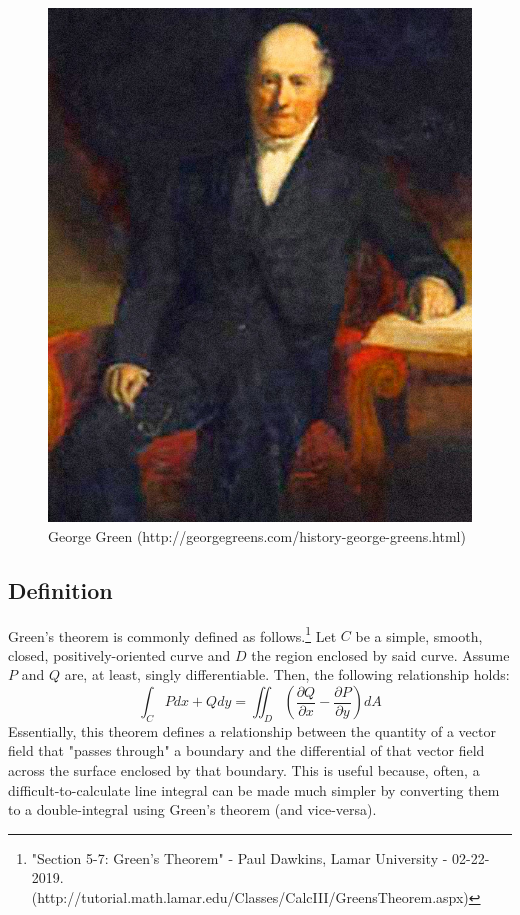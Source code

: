 \documentclass[11pt,English]{article}
\begin{document}
\begin{figure}
    \centering
    \includegraphics[scale=.2]{George_Green.jpg}
    \caption{George Green (http://georgegreens.com/history-george-greens.html)}
    \label{fig:my_label}
\end{figure}


\subsection{Definition}
Green's theorem is commonly defined as follows.\footnote{"Section 5-7: Green's Theorem" - Paul Dawkins, Lamar University - 02-22-2019. (http://tutorial.math.lamar.edu/Classes/CalcIII/GreensTheorem.aspx)} Let $C$ be a simple, smooth, closed, positively-oriented curve and $D$ the region enclosed by said curve. Assume $P$ and $Q$ are, at least, singly differentiable. Then, the following relationship holds:
$$
\int_C{ P dx + Q dy } = \iint_D{ \left( \frac{\partial Q}{\partial x} - \frac{\partial P}{\partial y} \right) dA }
$$
Essentially, this theorem defines a relationship between the quantity of a vector field that "passes through" a boundary and the differential of that vector field across the surface enclosed by that boundary. This is useful because, often, a difficult-to-calculate line integral can be made much simpler by converting them to a double-integral using Green's theorem (and vice-versa).
\end{document}
